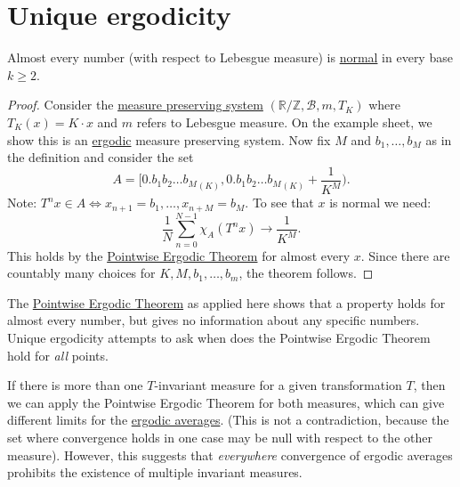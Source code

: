 \documentclass{article}
\begin{document}
\section{Unique ergodicity}
\begin{defi}[Normal]\hypertarget{def:normal}
  A\marginnote{\emph{Lecture 6}} number $x \in [0,1)$ is called \textbf{normal} in base $K$, if for every $b_1, b_2, \dotsc, b_M \in \{0, \dotsc, K\}$, we have
  \begin{equation*}
    \frac{1}{N} \left| \set{n \in \{0, \dotsc, N-1\} | x_{n+1} = b_1, \dotsc, x_{n+M} = b_M} \right| \to \frac{1}{K^M}
  \end{equation*}
  where $x = 0.x_1 x_2 \dotsm_{(K)}$ is the base $K$ expansion.
\end{defi}
\begin{thm}
  Almost every number (with respect to Lebesgue measure) is \hyperlink{def:normal}{normal} in every base $k \geq 2$.
\end{thm}
\begin{proof}
  Consider the \hyperlink{def:mps}{measure preserving system} $(\mathbb{R}/\mathbb{Z}, \mathcal{B}, m, T_K)$ where $T_K(x) = K\cdot x$ and $m$ refers to Lebesgue measure.
  On the example sheet, we show this is an \hyperlink{def:ergodic}{ergodic} measure preserving system.
  Now fix $M$ and $b_1, \dotsc, b_M$ as in the definition and consider the set
  \begin{equation*}
    A = \bigg[{0.b_1 b_2 \dots b_M}_{(K)}, {0.b_1 b_2 \dots b_M} _{(K)} + \frac{1}{K^M}\bigg).
  \end{equation*}
  Note: $T^n x \in A \iff x_{n+1} = b_1, \dotsc, x_{n+M} = b_M$.
  To see that $x$ is normal we need:
  \begin{equation*}
    \frac{1}{N} \sum_{n=0}^{N-1} \chi_A (T^n x) \to \frac{1}{K^M}.
  \end{equation*}
  This holds by the \hyperlink{thm:pet}{Pointwise Ergodic Theorem} for almost every $x$.
  Since there are countably many choices for $K,M,b_1, \dotsc, b_m$, the theorem follows.
\end{proof}

The \hyperlink{thm:pet}{Pointwise Ergodic Theorem} as applied here shows that a property holds for almost every number, but gives no information about any specific numbers.
Unique ergodicity attempts to ask when does the Pointwise Ergodic Theorem hold for \emph{all} points.

If there is more than one $T$-invariant measure for a given transformation $T$, then we can apply the Pointwise Ergodic Theorem for both measures, which can give different limits for the \hyperlink{def:ergavg}{ergodic averages}.
(This is not a contradiction, because the set where convergence holds in one case may be null with respect to the other measure).
However, this suggests that \emph{everywhere} convergence of ergodic averages prohibits the existence of multiple invariant measures.
\end{document}
